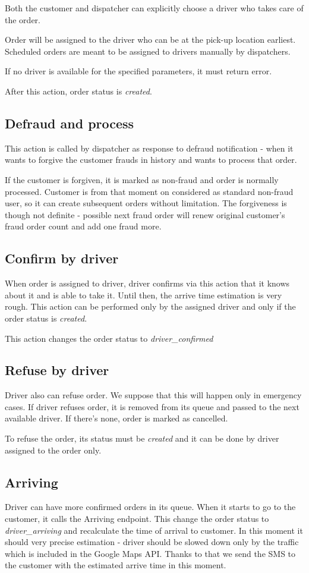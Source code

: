			Both the customer and dispatcher can explicitly choose a driver who takes care of the order. 
			
			Order will be assigned to the driver who can be at the pick-up location earliest. Scheduled orders are meant to be assigned to drivers manually by dispatchers.
			
			 If no driver is available for the specified parameters, it must return error.
			 
			 After this action, order status is \textit{created}.
		\subsection{Defraud and process}
			This action is called by dispatcher as response to defraud notification - when it wants to forgive the customer frauds in history and wants to process that order.
			
			If the customer is forgiven, it is marked as non-fraud and order is normally processed. Customer is from that moment on considered as standard non-fraud user, so it can create subsequent orders without limitation. The forgiveness is though not definite - possible next fraud order will renew original customer's fraud order count and add one fraud more.
		\subsection{Confirm by driver}
			When order is assigned to driver, driver confirms via this action that it knows about it and is able to take it. Until then, the arrive time estimation is very rough. This action can be performed only by the assigned driver and only if the order status is \textit{created}.
			
			This action changes the order status to \textit{driver\_confirmed}
		\subsection{Refuse by driver}
			Driver also can refuse order. We suppose that this will happen only in emergency cases. If driver refuses order, it is removed from its queue and passed to the next available driver. If there's none, order is marked as cancelled.
			
			To refuse the order, its status must be \textit{created} and it can be done by driver assigned to the order only.
		\subsection{Arriving}
			Driver can have more confirmed orders in its queue. When it starts to go to the customer, it calls the Arriving endpoint. This change the order status to \textit{driver\_arriving} and recalculate the time of arrival to customer. In this moment it should very precise estimation - driver should be slowed down only by the traffic which is included in the Google Maps API. Thanks to that we send the SMS to the customer with the estimated arrive time in this moment.
			
